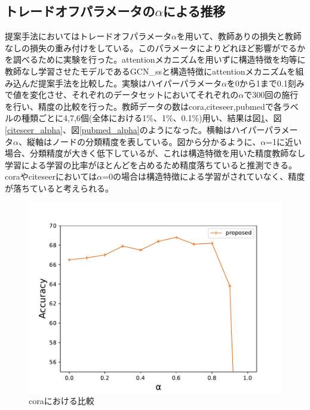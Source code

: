 \subsection{トレードオフパラメータの$\alpha$による推移}
提案手法においてはトレードオフパラメータ$\alpha$を用いて、教師ありの損失と教師なしの損失の重み付けをしている。このパラメータによりどれほど影響がでるかを調べるために実験を行った。attentionメカニズムを用いずに構造特徴を均等に教師なし学習させたモデルであるGCN\_ssと構造特徴にattentionメカニズムを組み込んだ提案手法を比較した。実験はハイパーパラメータ$\alpha$を0から1まで0.1刻みで値を変化させ、それぞれのデータセットにおいてそれぞれの$\alpha$で300回の施行を行い、精度の比較を行った。教師データの数はcora,citeseer,pubmedで各ラベルの種類ごとに4,7,6個(全体における1\%、1\%、0.1\%)用い、結果は図\ref{cora_alpha}、図\ref{citeseer_alpha}、図\ref{pubmed_alpha}のようになった。横軸はハイパーパラメータ$\alpha$、縦軸はノードの分類精度を表している。図から分かるように、$\alpha$=1に近い場合、分類精度が大きく低下しているが、これは構造特徴を用いた精度教師なし学習による学習の比率がほとんどを占めるため精度落ちていると推測できる。coraやciteseerにおいては$\alpha$=0の場合は構造特徴による学習がされていなく、精度が落ちていると考えられる。

\begin{figure}[h]
  \centering
    \includegraphics[width=12cm]{figures/cora_solo.pdf}
     \vspace*{0.5cm} 
    \caption{coraにおける比較} %
    \label{cora_alpha} %
\end{figure}

